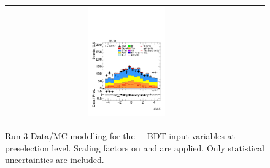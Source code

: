 \begin{figure}[htbp]
\begin{tabular}{@{}c c c@{}}
    \includegraphics[width=0.33\textwidth]{images/plots_modelling_run2_run3_variables/run_3_tth/plot_eta4_hh_tth_22_23_24.pdf}
  \end{tabular}

  \caption{Run-3 Data/MC modelling for the \thqb + \ttH BDT input variables at preselection level. Scaling factors on \ztautau and \ttbar are applied. Only statistical uncertainties are included.}
  \label{tth_vars_modelling_run3_1}
\end{figure}

